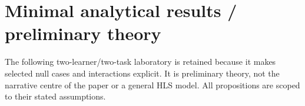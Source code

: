 \section{Minimal analytical results / preliminary theory}

The following two-learner/two-task laboratory is retained because it makes selected null cases and interactions explicit. It is preliminary theory, not the narrative centre of the paper or a general HLS model. All propositions are scoped to their stated assumptions.



